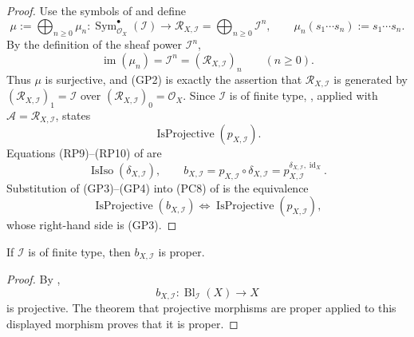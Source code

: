 \begin{proof}
  Use the symbols of
   and define
  \[
    \mu:=\bigoplus_{n\geq0}\mu_n\colon
      \operatorname{Sym}_{\mathcal O_X}^{\bullet}(\mathcal I)
        \longrightarrow
      \mathscr R_{X,\mathcal I}=\bigoplus_{n\geq0}\mathcal I^n,
    \qquad
    \mu_n(s_1\cdots s_n):=s_1\cdots s_n.                       \tag{GP1}
  \]
  By the definition of the sheaf power $\mathcal I^n$,
  \[
    \operatorname{im}(\mu_n)=\mathcal I^n
      =(\mathscr R_{X,\mathcal I})_n\qquad(n\geq0).             \tag{GP2}
  \]
  Thus $\mu$ is surjective, and (GP2) is exactly the assertion that
  $\mathscr R_{X,\mathcal I}$ is generated by
  $(\mathscr R_{X,\mathcal I})_1=\mathcal I$ over
  $(\mathscr R_{X,\mathcal I})_0=\mathcal O_X$.  Since $\mathcal I$ is of
  finite type,
  \cite[\href{https://stacks.math.columbia.edu/tag/07ZS}{Tag 07ZS}]
  {stacks-project}, applied with
  $\mathcal A=\mathscr R_{X,\mathcal I}$, states
  \[
    \operatorname{IsProjective}(p_{X,\mathcal I}).              \tag{GP3}
  \]
  Equations (RP9)--(RP10) of
   are
  \[
    \operatorname{IsIso}(\delta_{X,\mathcal I}),
    \qquad
    b_{X,\mathcal I}=p_{X,\mathcal I}\circ\delta_{X,\mathcal I}
      =p_{X,\mathcal I}^{\delta_{X,\mathcal I},\operatorname{id}_X}.
                                                                    \tag{GP4}
  \]
  Substitution of (GP3)--(GP4) into (PC8) of
   is the equivalence
  \[
    \operatorname{IsProjective}(b_{X,\mathcal I})
      \Longleftrightarrow
    \operatorname{IsProjective}(p_{X,\mathcal I}),
  \]
  whose right-hand side is (GP3).
\end{proof}

\begin{theorem}
  \label{thm:nagata-global-blowup-proper}
  \lean{}

  If \(\mathcal I\) is of finite type, then
  \(b_{X,\mathcal I}\) is proper.
\end{theorem}

\begin{proof}
  By ,
  \[
    b_{X,\mathcal I}\colon\operatorname{Bl}_{\mathcal I}(X)\to X
  \]
  is projective.  The theorem that projective morphisms are proper applied to
  this displayed morphism proves that it is proper.
\end{proof}


